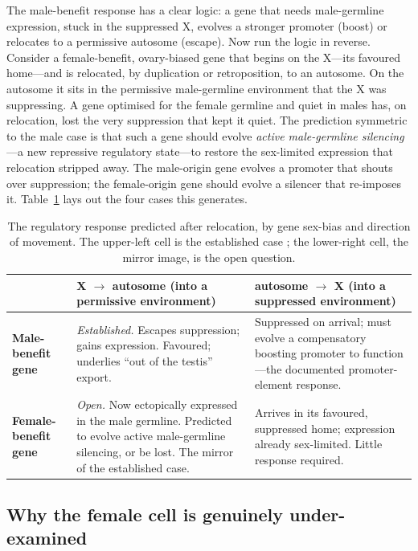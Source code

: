 \documentclass[11pt,a4paper]{article}
\begin{document}
The male-benefit response has a clear logic: a gene that needs male-germline expression, stuck in the suppressed X, evolves a stronger promoter (boost) or relocates to a permissive autosome (escape). Now run the logic in reverse. Consider a female-benefit, ovary-biased gene that begins on the X---its favoured home---and is relocated, by duplication or retroposition, to an autosome. On the autosome it sits in the permissive male-germline environment that the X was suppressing. A gene optimised for the female germline and quiet in males has, on relocation, lost the very suppression that kept it quiet. The prediction symmetric to the male case is that such a gene should evolve \emph{active male-germline silencing}---a new repressive regulatory state---to restore the sex-limited expression that relocation stripped away. The male-origin gene evolves a promoter that shouts over suppression; the female-origin gene should evolve a silencer that re-imposes it. Table~\ref{tab:asymmetry} lays out the four cases this generates.

\begin{table}[h!]
\centering
\small
\caption{The regulatory response predicted after relocation, by gene sex-bias and direction of movement. The upper-left cell is the established case \citep{landeen2016}; the lower-right cell, the mirror image, is the open question.}
\label{tab:asymmetry}
\begin{tabular}{p{2.8cm} p{5.3cm} p{5.3cm}}
\toprule
 & \textbf{X $\rightarrow$ autosome} (into a permissive environment) & \textbf{autosome $\rightarrow$ X} (into a suppressed environment) \\
\midrule
\textbf{Male-benefit gene} & \emph{Established.} Escapes suppression; gains expression. Favoured; underlies ``out of the testis'' export. & Suppressed on arrival; must evolve a compensatory boosting promoter to function---the documented promoter-element response. \\
\addlinespace
\textbf{Female-benefit gene} & \emph{Open.} Now ectopically expressed in the male germline. Predicted to evolve active male-germline silencing, or be lost. The mirror of the established case. & Arrives in its favoured, suppressed home; expression already sex-limited. Little response required. \\
\bottomrule
\end{tabular}
\end{table}

\subsection{Why the female cell is genuinely under-examined}
\end{document}
